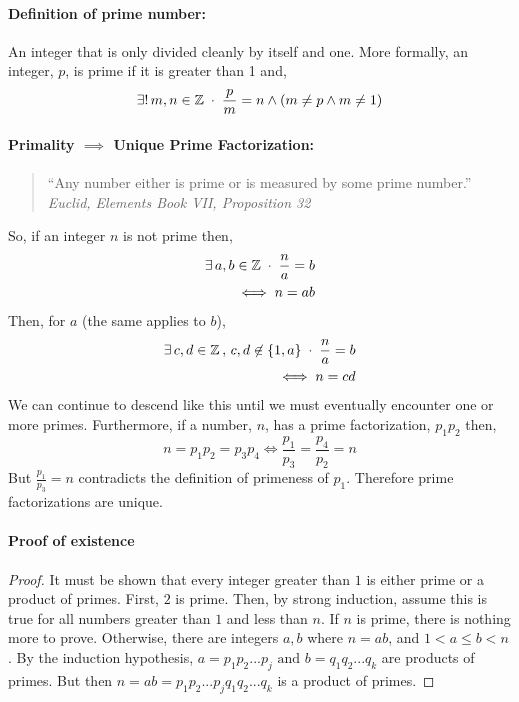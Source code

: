 \documentclass[../MathsNotesBase.tex]{subfiles}
\begin{document}
{		\paragraph{Definition of prime number:} An integer that is only divided cleanly by itself and one.
		More formally, an integer, $p$, is prime if it is greater than 1 and,
		\[ \exists!\,m,n \in \mathbb{Z}^{\;} \cdot \;\frac{p}{m} = n \wedge (m \neq p \wedge m \neq 1) \]
		
		\paragraph{Primality $ \implies $ Unique Prime Factorization:}
		\begin{quote}
			``Any number either is prime or is measured by some prime number.''\\
			\textit{Euclid, Elements Book VII, Proposition 32}
		\end{quote}
		So, if an integer $n$ is not prime then,
		\begin{align*} 
		\exists\,a,b \in \mathbb{Z}^{\;} \cdot \; \frac{n}{a} = b \\
		\iff n = ab
		\end{align*}
		Then, for $a$ (the same applies to $b$),
		\begin{align*}
		\exists\,c,d \in \mathbb{Z}^{\,},\,c,d \not\in \{1,a\}\; \cdot \; \frac{n}{a} = b \\
		\iff n = cd
		\end{align*}
		We can continue to descend like this until we must eventually encounter one or more primes.
		Furthermore, if a number, $n$, has a prime factorization, $p_1p_2$ then,
		\[ n = p_1p_2 = p_3p_4 \iff \frac{p_1}{p_3} = \frac{p_4}{p_2} = n \]
		But $\frac{p_1}{p_3} = n$ contradicts the definition of primeness of $p_1$. Therefore prime factorizations are unique.
		
		\paragraph{Proof of existence}
		\begin{proof}
			It must be shown that every integer greater than $ 1 $ is either prime or a product of primes. First, $ 2 $ is prime. Then, by strong induction, assume this is true for all numbers greater than $ 1 $ and less than $ n $. 
			If $ n $ is prime, there is nothing more to prove. 
			Otherwise, there are integers $ a, b $ where $ n = ab $, and $ 1 < a \leq b < n $. By the induction hypothesis, $ a = p_1p_2...p_j \text{ and } b = q_1q_2...q_k $ are products of primes. But then $ n = ab = p_1p_2...p_jq_1q_2...q_k $ is a product of primes.
		\end{proof}
		
}
\end{document}

